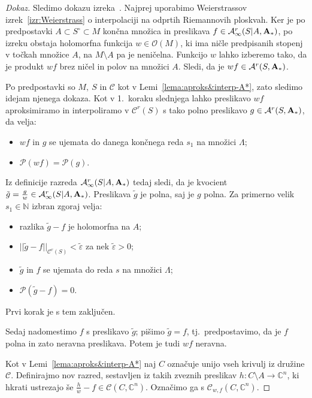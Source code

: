 \documentclass[12pt,a4paper,twoside]{article}
\theoremstyle{definition} %
\newenvironment{dokaz}[1][Dokaz]{\begin{proof}[#1]}{\end{proof}}
\theoremstyle{plain} %
\numberwithin{equation}{section}  %
\begin{document}
\begin{dokaz}
Sledimo dokazu izreka~\cite[Theorem~3.1]{alarcon2019algebraic}.
Najprej uporabimo Weierstrassov izrek~\ref{izr:Weierstrass} o interpolaciji na odprtih Riemannovih ploskvah.
Ker je po predpostavki $A \subset S^{\circ} \subset M$ končna množica in preslikava $f \in \mathcal{A}_{\infty}^{r}(S|A, \textup{\textbf{A}}_{*})$, po izreku obstaja holomorfna funkcija $w \in \mathcal{O}(M)$, ki ima ničle predpisanih stopenj v točkah množice $A$, na $M \setminus A$ pa je neničelna.
Funkcijo $w$ lahko izberemo tako, da je produkt $wf$ brez ničel in polov na množici $A$. Sledi, da je $wf \in \mathcal{A}^{r}(S, \textup{\textbf{A}}_{*})$.

Po predpostavki so $M, \ S$ in $\mathcal{C}$ kot v Lemi~\ref{lema:aproks&interp-A*}, zato sledimo idejam njenega dokaza.
Kot v 1.~koraku slednjega lahko preslikavo $wf$ aproksimiramo in interpoliramo v $\mathcal{C}^{r}(S)$ s tako polno preslikavo $g \in \mathcal{A}^{r}(S, \textup{\textbf{A}}_{*})$, da velja:
\begin{itemize}
\item $wf$ in $g$ se ujemata do danega končnega reda $s_1$ na množici $\Lambda$;
\item $\mathcal{P}(wf) = \mathcal{P}(g)$.
\end{itemize}
Iz definicije razreda $\mathcal{A}_{\infty}^{r}(S|A, \textup{\textbf{A}}_{*})$ tedaj sledi, da je kvocient $\tilde{g} = \frac{g}{w} \in \mathcal{A}_{\infty}^{r}(S|A, \textup{\textbf{A}}_{*})$. Preslikava $\tilde{g}$ je polna, saj je $g$ polna.
Za primerno velik $s_1 \in \mathbb{N}$ izbran zgoraj velja:
\begin{itemize}
\item razlika $\tilde{g}-f$ je holomorfna na $A$;
\item $||\tilde{g}-f||_{\mathcal{C}^{r}(S)} < \tilde{\varepsilon}$ za nek $\tilde{\varepsilon}>0$;
\item$\tilde{g}$ in $f$ se ujemata do reda $s$ na množici $\Lambda$;
\item $\mathcal{P}(\tilde{g}-f) = 0$.
\end{itemize}
Prvi korak je s tem zaključen. \newline

Sedaj nadomestimo $f$ s preslikavo $\tilde{g}$; pišimo $\tilde{g}=f$, tj.~predpostavimo, da je $f$ polna in zato neravna preslikava. Potem je tudi $wf$ neravna.

Kot v Lemi~\ref{lema:aproks&interp-A*} naj $C$ označuje unijo vseh krivulj iz družine $\mathcal{C}$.
Definirajmo nov razred, sestavljen iz takih zveznih preslikav $h \colon C \setminus A \to \mathbb{C}^{n}$, ki hkrati ustrezajo še $\frac{h}{w}-f \in \mathcal{C}(C, \mathbb{C}^{n})$. Označimo ga s $\mathcal{C}_{w,f}(C, \mathbb{C}^{n})$.


\end{dokaz}
\end{document}
